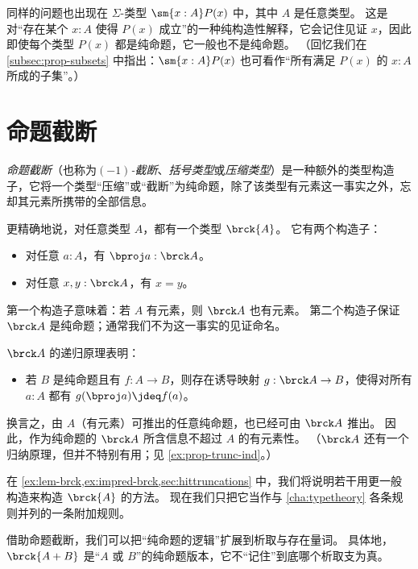 %
同样的问题也出现在 $\Sigma$-类型 $\sm{x:A} P(x)$ 中，其中 $A$ 是任意类型。
这是对“存在某个 $x:A$ 使得 $P(x)$ 成立”的一种纯构造性解释，它会记住见证 $x$，因此即使每个类型 $P(x)$ 都是纯命题，它一般也不是纯命题。
（回忆我们在 \cref{subsec:prop-subsets} 中指出：$\sm{x:A} P(x)$ 也可看作“所有满足 $P(x)$ 的 $x:A$ 所成的子集”。）

\section{命题截断}
\label{subsec:prop-trunc}

%
%
%
%
%
\emph{命题截断}（也称为\emph{$(-1)$-截断}、\emph{括号类型}或\emph{压缩类型}）是一种额外的类型构造子，它将一个类型“压缩”或“截断”为纯命题，除了该类型有元素这一事实之外，忘却其元素所携带的全部信息。

更精确地说，对任意类型 $A$，都有一个类型 $\brck{A}$。
它有两个构造子：
\begin{itemize}
\item 对任意 $a:A$，有 $\bproj a : \brck A$。
\item 对任意 $x,y:\brck A$，有 $x=y$。
\end{itemize}
第一个构造子意味着：若 $A$ 有元素，则 $\brck A$ 也有元素。
第二个构造子保证 $\brck A$ 是纯命题；通常我们不为这一事实的见证命名。

%
$\brck A$ 的递归原理表明：
\begin{itemize}
\item 若 $B$ 是纯命题且有 $f:A\to B$，则存在诱导映射 $g:\brck A \to B$，使得对所有 $a:A$ 都有 $g(\bproj a) \jdeq f(a)$。
\end{itemize}
换言之，由 $A$（有元素）可推出的任意纯命题，也已经可由 $\brck A$ 推出。
因此，作为纯命题的 $\brck A$ 所含信息不超过 $A$ 的有元素性。
（$\brck A$ 还有一个归纳原理，但并不特别有用；见 \cref{ex:prop-trunc-ind}。）

在 \cref{ex:lem-brck,ex:impred-brck,sec:hittruncations} 中，我们将说明若干用更一般构造来构造 $\brck{A}$ 的方法。
现在我们只把它当作与 \cref{cha:typetheory} 各条规则并列的一条附加规则。

借助命题截断，我们可以把“纯命题的逻辑”扩展到析取与存在量词。
具体地，$\brck{A+B}$ 是“$A$ 或 $B$”的纯命题版本，它不“记住”到底哪个析取支为真。

